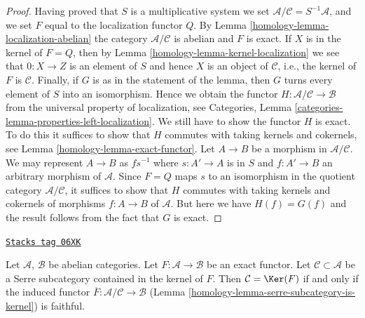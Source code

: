 \begin{proof}
\medskip\noindent
Having proved that $S$ is a multiplicative system we set
$\mathcal{A}/\mathcal{C} = S^{-1}\mathcal{A}$, and we set
$F$ equal to the localization functor $Q$. By
Lemma \ref{homology-lemma-localization-abelian}
the category $\mathcal{A}/\mathcal{C}$ is abelian and $F$ is exact.
If $X$ is in the kernel of $F = Q$, then by
Lemma \ref{homology-lemma-kernel-localization}
we see that $0 : X \to Z$ is an element of $S$ and hence
$X$ is an object of $\mathcal{C}$, i.e., the kernel of
$F$ is $\mathcal{C}$.
Finally, if $G$ is as in the statement of the lemma, then $G$ turns
every element of $S$ into an isomorphism. Hence we obtain the
functor $H : \mathcal{A}/\mathcal{C} \to \mathcal{B}$ from
the universal property of localization, see
Categories, Lemma \ref{categories-lemma-properties-left-localization}.
We still have to show the functor $H$ is exact.
To do this it suffices to show that $H$ commutes
with taking kernels and cokernels, see Lemma \ref{homology-lemma-exact-functor}.
Let $A \to B$ be a morphism in $\mathcal{A}/\mathcal{C}$.
We may represent $A \to B$ as $fs^{-1}$ where $s : A' \to A$
is in $S$ and $f : A' \to B$ an arbitrary morphism of $\mathcal{A}$.
Since $F = Q$ maps $s$ to an isomorphism in the quotient category
$\mathcal{A}/\mathcal{C}$, it suffices to show that $H$ commutes with taking
kernels and cokernels of morphisms $f : A \to B$ of $\mathcal{A}$.
But here we have $H(f) = G(f)$ and the result follows
from the fact that $G$ is exact.
\end{proof}

\begin{lemma}
\label{homology-lemma-quotient-by-kernel-exact-functor}
\href{https://stacks.math.columbia.edu/tag/06XK}{\texttt{Stacks tag 06XK}}

Let $\mathcal{A}$, $\mathcal{B}$ be abelian categories.
Let $F : \mathcal{A} \to \mathcal{B}$ be an exact functor.
Let $\mathcal{C} \subset \mathcal{A}$ be a Serre subcategory
contained in the kernel of $F$.
Then $\mathcal{C} = \Ker(F)$ if and only if the induced functor
$\overline{F} : \mathcal{A}/\mathcal{C} \to \mathcal{B}$
(Lemma \ref{homology-lemma-serre-subcategory-is-kernel}) is faithful.
\end{lemma}

